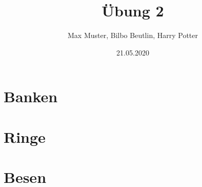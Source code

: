 \documentclass[11pt, a4paper]{scrreprt}
\title{Übung 2}
\author{Max Muster, Bilbo Beutlin, Harry Potter}
\date{21.05.2020}
\begin{document}
\maketitle
\tableofcontents

\chapter{Banken}


\chapter{Ringe}


\chapter{Besen}

\end{document}
